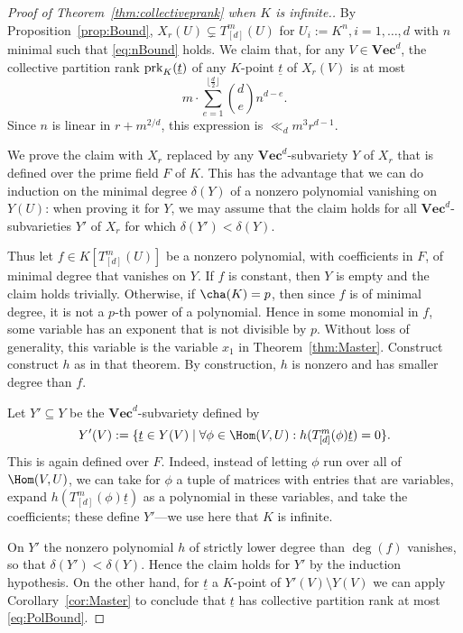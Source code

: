 \documentclass{amsart}
\renewcommand{\Vec}{\mathbf{Vec}}
\newcommand{\prk}{\textnormal{prk}}
\newcommand{\ul}[1]{\underline{#1}}
\begin{document}
\begin{proof}[Proof of Theorem~\ref{thm:collectiveprank} when $K$ is
infinite.]

By Proposition~\ref{prop:Bound}, $X_r(U) \subsetneq T^m_{[d]}(U)$ for
$U_i:=K^n, i=1,\ldots,d$ with $n$ minimal such that \eqref{eq:nBound}
holds. We claim that, for any $V \in \Vec^d$, the collective partition
rank $\prk_K(\ul{t})$ of any $K$-point $\ul{t}$ of $X_r(V)$ is at most
\begin{equation} \label{eq:PolBound} 
m\cdot \sum_{e=1}^{\lfloor \frac{d}{2} \rfloor} \binom{d}{e} n^{d-e}. 
\end{equation}
Since $n$ is linear in $r+m^{2/d}$, this expression is $\ll_d m^3 r^{d-1}$. 

We prove the claim with $X_r$ replaced by any $\Vec^d$-subvariety $Y$
of $X_r$ that is defined over the prime field $F$ of $K$. This has the
advantage that we can do induction on the minimal degree $\delta(Y)$
of a nonzero polynomial vanishing on $Y(U)$: when proving it for $Y$,
we may assume that the claim holds for all $\Vec^d$-subvarieties $Y'$
of $X_r$ for which $\delta(Y')<\delta(Y)$.

Thus let $f \in K[T^m_{[d]}(U)]$ be a nonzero polynomial, with
coefficients in $F$, of minimal degree that vanishes on $Y$. If $f$ is
constant, then $Y$ is empty and the claim holds trivially. Otherwise,
if $\cha(K)=p$, then since $f$ is of minimal degree, it is not a $p$-th
power of a polynomial. Hence in some monomial in $f$, some variable
has an exponent that is not divisible by $p$. 
Without loss of generality, this variable is the variable $x_1$ in
Theorem~\ref{thm:Master}. Construct construct $h$ as in that theorem. By
construction, $h$ is nonzero and has smaller degree than $f$.

Let $Y' \subseteq Y$ be the $\Vec^d$-subvariety defined by 
\begin{equation} \label{eq:Yprime} 
Y'(V):=\{\ul{t} \in Y(V) \mid \forall \phi \in \Hom(V,U):
h(T^m_{[d]}(\phi)\ul{t}) = 0\}. 
\end{equation}
This is again defined over $F$. Indeed, instead of letting $\phi$ run
over all of $\Hom(V,U)$, we can take for $\phi$ a tuple of matrices with
entries that are variables, expand $h(T^m_{[d]}(\phi)\ul{t})$ as a polynomial
in these variables, and take the coefficients; these define $Y'$---we
use here that $K$ is infinite.

On $Y'$ the nonzero polynomial
$h$ of strictly lower degree than $\deg(f)$ vanishes, so that
$\delta(Y')<\delta(Y)$. Hence the claim holds for $Y'$ by the induction
hypothesis. On the other hand, for $\ul{t}$ a $K$-point of $Y'(V) \setminus Y(V)$ we can
apply Corollary~\ref{cor:Master} to conclude that $\ul{t}$ has collective
partition rank at most \eqref{eq:PolBound}.
\end{proof}
\end{document}
